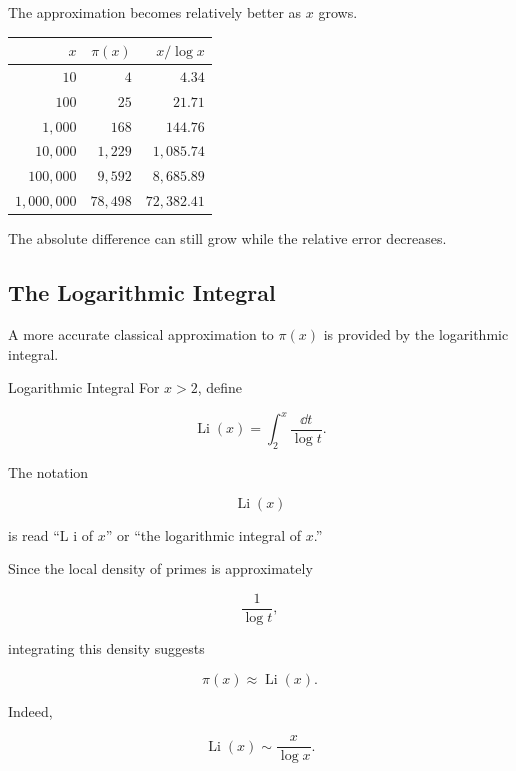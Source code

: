 The approximation becomes relatively better as \(x\) grows.

\begin{center}
\begin{tabular}{r|r|r}
\toprule
\(x\) & \(\pi(x)\) & \(x/\log x\)\\
\midrule
\(10\) & \(4\) & \(4.34\)\\
\(100\) & \(25\) & \(21.71\)\\
\(1{,}000\) & \(168\) & \(144.76\)\\
\(10{,}000\) & \(1{,}229\) & \(1{,}085.74\)\\
\(100{,}000\) & \(9{,}592\) & \(8{,}685.89\)\\
\(1{,}000{,}000\) & \(78{,}498\) & \(72{,}382.41\)\\
\bottomrule
\end{tabular}
\end{center}

The absolute difference can still grow while the relative error decreases.

\subsection{The Logarithmic Integral}
\label{subsec:logarithmic-integral}

A more accurate classical approximation to \(\pi(x)\) is provided by the
logarithmic integral.

\begin{definitionbox}{Logarithmic Integral}
For \(x>2\), define

\[ \operatorname{Li}(x)=\int_2^x\frac{\dd t}{\log t}. \]
\end{definitionbox}

The notation

\[ \operatorname{Li}(x) \]

is read ``L i of \(x\)'' or ``the logarithmic integral of \(x\).''

Since the local density of primes is approximately

\[ \frac{1}{\log t}, \]

integrating this density suggests

\[ \pi(x)\approx\operatorname{Li}(x). \]

Indeed,

\[ \operatorname{Li}(x)\sim\frac{x}{\log x}. \]

